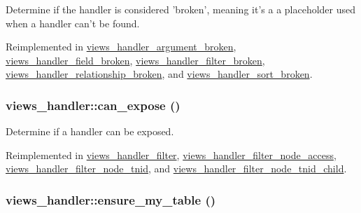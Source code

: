 Determine if the handler is considered 'broken', meaning it's a a placeholder used when a handler can't be found. 

Reimplemented in \hyperlink{classviews__handler__argument__broken_fb6937305424b7b8a2e6fb9e3d4ef1fb}{views\_\-handler\_\-argument\_\-broken}, \hyperlink{classviews__handler__field__broken_f579634a7ec51fa709d7c0cddc135725}{views\_\-handler\_\-field\_\-broken}, \hyperlink{classviews__handler__filter__broken_912a78cd8ee1d5c139613d252f2ca9e1}{views\_\-handler\_\-filter\_\-broken}, \hyperlink{classviews__handler__relationship__broken_c4e5826e70953e7ec16f50ec264fdb53}{views\_\-handler\_\-relationship\_\-broken}, and \hyperlink{classviews__handler__sort__broken_082f810e9181d6b2f878013897e3cc17}{views\_\-handler\_\-sort\_\-broken}.\hypertarget{classviews__handler_92517d122d69dc6f64a9edb80d55057d}{
\subsubsection[{can\_\-expose}]{\setlength{\rightskip}{0pt plus 5cm}views\_\-handler::can\_\-expose ()}}
\label{classviews__handler_92517d122d69dc6f64a9edb80d55057d}


Determine if a handler can be exposed. 

Reimplemented in \hyperlink{classviews__handler__filter_f0e5810a2a2f194cd6af0fca9c858756}{views\_\-handler\_\-filter}, \hyperlink{classviews__handler__filter__node__access_20eacba1b9be3c0e6b8245191b60a9ff}{views\_\-handler\_\-filter\_\-node\_\-access}, \hyperlink{classviews__handler__filter__node__tnid_9e6111d77af1aefee0b78d7b3b2c25cc}{views\_\-handler\_\-filter\_\-node\_\-tnid}, and \hyperlink{classviews__handler__filter__node__tnid__child_2c6527f01666eaf0ba38eff4798ec732}{views\_\-handler\_\-filter\_\-node\_\-tnid\_\-child}.\hypertarget{classviews__handler_947f21ef0f21a77f4d103af4702b3600}{
\subsubsection[{ensure\_\-my\_\-table}]{\setlength{\rightskip}{0pt plus 5cm}views\_\-handler::ensure\_\-my\_\-table ()}}
\label{classviews__handler_947f21ef0f21a77f4d103af4702b3600}


